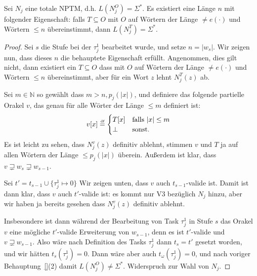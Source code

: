 \begin{claim}
    Sei $N_j$ eine totale NPTM, d.h. $L(N_j^O)=\Sigma^*$.
    Es existiert eine Länge $n$ mit folgender Eigenschaft: 
    falls $T\subseteq O$ mit $O$ auf Wörtern der Länge $\neq e(\cdot)$ und Wörtern $\leq n$ übereinstimmt, dann $L(N_j^T)=\Sigma^*$.
\end{claim}
\begin{proof}
    Sei $s$ die Stufe bei der $\tau^1_j$ bearbeitet wurde, 
    und setze $n=|w_{s}|$.
    Wir zeigen nun, dass dieses $n$ die behauptete Eigenschaft erfüllt.
    Angenommen, dies gilt nicht, dann existiert ein $T\subseteq O$ dass mit $O$ auf Wörtern der Länge $\neq e(\cdot)$ und Wörtern $\leq n$ übereinstimmt, aber für ein Wort $z$ lehnt $N_j^T(z)$ ab.

    Sei $m\in\mathbb N$ so gewählt dass $m> n, p_j(|x|)$, und definiere das folgende partielle Orakel $v$, das genau für alle Wörter der Länge $\leq m$ definiert ist:
    \[ v[x] \stackrel{\text{\smash{\tiny df}}}{=} \begin{cases} T[x] & \text{falls $|x|\leq m$} \\ \bot & \text{sonst}. \end{cases}\]
    Es ist leicht zu sehen, dass $N_j^v(z)$ definitiv ablehnt, stimmen $v$ und $T$ ja auf allen Wörtern der Länge $\leq p_j(|x|)$ überein.
    Außerdem ist klar, dass $v\sqsupsetneq w_s \sqsupsetneq w_{s-1}$.

    Sei $t'=t_{s-1}\cup \{\tau^1_j\mapsto 0\}$
    Wir zeigen unten, dass $v$ auch $t_{s-1}$-valide ist. Damit ist dann klar,
    dass $v$ auch $t'$-valide ist: es kommt nur V3 bezüglich $N_j$ hinzu, aber wir haben ja bereits gesehen dass $N_j^v(z)$ definitiv ablehnt.

    Insbesondere ist dann während der Bearbeitung von Task $\tau^1_{j}$ in Stufe $s$ das Orakel $v$ eine mögliche $t'$-valide Erweiterung von $w_{s-1}$, denn es ist $t'$-valide und $v\sqsupsetneq w_{s-1}$. Also wäre nach Definition des Tasks $\tau^1_{j}$ dann $t_{s}=t'$ gesetzt worden,
    und wir hätten $t_s(\tau^1_j)=0$.
    Dann wäre aber auch $t_\omega(\tau^1_j)=0$, und nach voriger Behauptung~\ref{}(2) damit $L(N_j^O)\neq\Sigma^*$. Widerspruch zur Wahl von $N_j$.


\end{proof}
